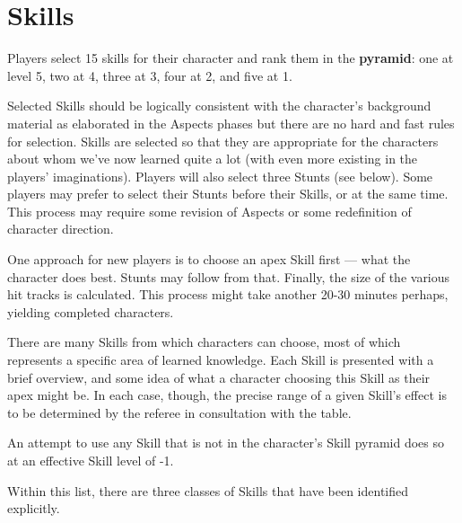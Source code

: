 \section{Skills}\label{sec:skills} %



Players select 15 skills for their character and rank them in the \textbf{pyramid}: one at level 5, two at 4, three at 3, four at 2, and five at 1.

Selected Skills should be logically consistent with the character's background material as elaborated in the Aspects phases but there are no hard and fast rules for selection. Skills are selected so that they are appropriate for the characters about whom we've now learned quite a lot (with even more existing in the players' imaginations). Players will also select three Stunts (see below). Some players may prefer to select their Stunts before their Skills, or at the same time. This process may require some revision of Aspects or some redefinition of character direction.

One approach for new players is to choose an apex Skill first --- what the character does best. Stunts may follow from that. Finally, the size of the various hit tracks is calculated. This process might take another 20-30 minutes perhaps, yielding completed characters.

There are many Skills from which characters can choose, most of which represents a specific area of learned knowledge. Each Skill is presented with a brief overview, and some idea of what a character choosing this Skill as their apex might be. In each case, though, the precise range of a given Skill's effect is to be determined by the referee in consultation with the table.

An attempt to use any Skill that is not in the character's Skill pyramid does so at an effective Skill level of -1.

Within this list, there are three classes of Skills that have been identified explicitly.

